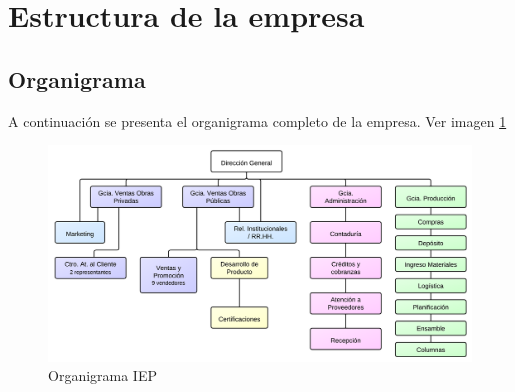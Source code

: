 \section{Estructura de la empresa}

\subsection{Organigrama}
A continuación se presenta el organigrama completo de la empresa. Ver imagen \ref{organigramaIEP}

\begin{figure}[h!]
  \centering
  \includegraphics[scale=0.85]{./Images/organigrama-pasado.png}
  \caption{Organigrama IEP}\label{organigramaIEP}
\end{figure}
